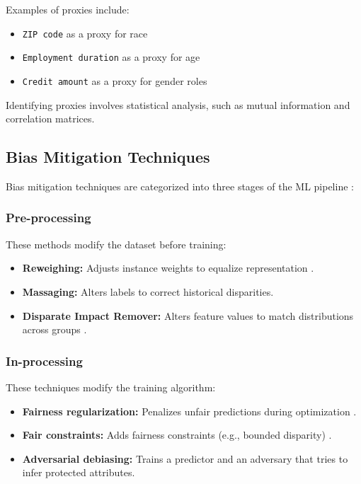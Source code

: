 Examples of proxies include:

\begin{itemize}
    \item \texttt{ZIP code} as a proxy for race
    \item \texttt{Employment duration} as a proxy for age
    \item \texttt{Credit amount} as a proxy for gender roles
\end{itemize}

Identifying proxies involves statistical analysis, such as mutual information and correlation matrices.

\subsection{Bias Mitigation Techniques}

Bias mitigation techniques are categorized into three stages of the ML pipeline \cite{bellamy2019aif360,pessach2023algorithmic}:

\subsubsection{Pre-processing}

These methods modify the dataset before training:

\begin{itemize}
    \item \textbf{Reweighing:} Adjusts instance weights to equalize representation \cite{kamiran2012data}.
    \item \textbf{Massaging:} Alters labels to correct historical disparities.
    \item \textbf{Disparate Impact Remover:} Alters feature values to match distributions across groups \cite{feldman2015certifying}.
\end{itemize}

\subsubsection{In-processing}

These techniques modify the training algorithm:

\begin{itemize}
    \item \textbf{Fairness regularization:} Penalizes unfair predictions during optimization \cite{kamishima2012fairness}.
    \item \textbf{Fair constraints:} Adds fairness constraints (e.g., bounded disparity) \cite{zafar2017fairness}.
    \item \textbf{Adversarial debiasing:} Trains a predictor and an adversary that tries to infer protected attributes.
\end{itemize}

